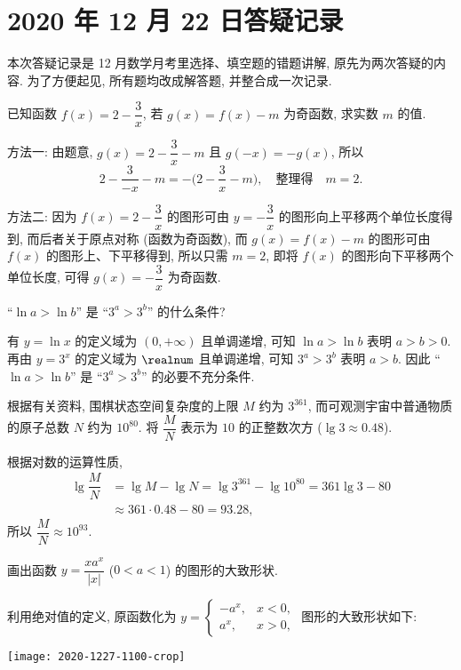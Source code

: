 \section{2020 年 12 月 22 日答疑记录}

本次答疑记录是 12 月数学月考里选择、填空题的错题讲解, 原先为两次答疑的内容. 为了方便起见, 所有题均改成解答题, 并整合成一次记录. 

\begin{example}
    已知函数 $f(x)=2-\dfrac3x$, 若 $g(x)= f(x)-m$ 为奇函数, 求实数 $m$ 的值.
\end{example}
\begin{solution}
    方法一: 由题意, $g(x)=2-\dfrac3x-m$ 且 $g(-x)= -g(x)$, 所以
    \[2-\dfrac3{-x}-m= -\biggl(2-\dfrac3x-m\biggl),\quad
        \text{整理得}\quad m=2.\]
    
    方法二: 因为 $f(x)=2-\dfrac3x$ 的图形可由 $y=-\dfrac3x$ 的图形向上平移两个单位长度得到, 而后者关于原点对称 (函数为奇函数), 而 $g(x)= f(x)-m$ 的图形可由 $f(x)$ 的图形上、下平移得到, 所以只需 $m=2$, 即将 $f(x)$ 的图形向下平移两个单位长度, 可得 $g(x)=-\dfrac3x$ 为奇函数.
\end{solution}

\begin{example}
    ``$\ln a>\ln b$'' 是 ``$3^a>3^b$'' 的什么条件?
\end{example}
\begin{solution}
    有 $y=\ln x$ 的定义域为 $(0,+\infty)$ 且单调递增, 可知 $\ln a>\ln b$ 表明 $a>b>0$. 再由 $y=3^x$ 的定义域为 $\realnum$ 且单调递增, 可知 $3^a>3^b$ 表明 $a>b$. 因此 ``$\ln a>\ln b$'' 是 ``$3^a>3^b$'' 的必要不充分条件.
\end{solution}


\begin{example}
    根据有关资料, 围棋状态空间复杂度的上限 $M$ 约为 $3^{361}$, 而可观测宇宙中普通物质的原子总数 $N$ 约为 $10^{80}$. 将 $\dfrac{M}{N}$ 表示为 $10$ 的正整数次方 ($\lg 3\approx 0.48$).
\end{example}
\begin{solution}
    根据对数的运算性质, 
    \[\begin{aligned}
        \lg \dfrac{M}{N}
        &= \lg M-\lg N= \lg 3^{361}- \lg 10^{80}
         = 361\lg 3- 80\\
        &\approx 361\cdot 0.48- 80
         = 93.28,
       \end{aligned}\]
    所以 $\dfrac{M}{N}\approx 10^{93}$.
\end{solution}

\begin{example}
    画出函数 $y= \dfrac{x a^x}{|x|}$ ($0<a<1$) 的图形的大致形状.
\end{example}
\begin{solution}
    利用绝对值的定义, 原函数化为 $y= \begin{cases}
        -a^x, & x<0,\\
        a^x, & x>0,
    \end{cases}$
    图形的大致形状如下:
    
    \begin{center}
        \texttt{[image: 2020-1227-1100-crop]}
    \end{center}
\end{solution}


